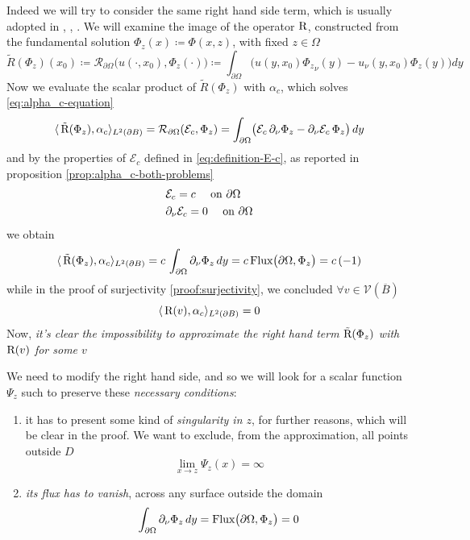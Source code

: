 \documentclass[10pt, a4paper, twoside, openright]{book}
\theoremstyle{definition}
\theoremstyle{plain}
\theoremstyle{plain}
\theoremstyle{plain}
\theoremstyle{plain}
\theoremstyle{plain}
\theoremstyle{plain}
\theoremstyle{plain}
\theoremstyle{plain}
\begin{document}
\par
Indeed we will try to consider the same right hand side term, which is usually adopted in \cite{colton-haddar:rg}, \cite{dicristo-sun:2006}, \cite{dicristo-sun:2007}.
We will examine the image of the operator $\textup{R}$, constructed from the fundamental solution $\Phi_z(x)\coloneqq\Phi(x,z)$, with fixed $z\in\Omega$
\begin{equation}
 \tilde{R}(\Phi_z)(x_0) \coloneqq \mathcal{R}_{\partial\Omega}\bigl(u(\cdot,x_0),\Phi_z(\cdot)\bigr)\coloneqq \int_{\partial \Omega}\bigl(u(y,x_0){\Phi_z}_\nu (y) - u_\nu(y,x_0)\Phi_z(y)\bigr)dy
\end{equation}
Now we evaluate the scalar product of $\tilde{R}(\Phi_z)$ with $\alpha_{c}$, which solves \eqref{eq:alpha_c-equation}
\begin{equation}
 \langle \, \tilde{\textup{R}}(\Phi_z) ,\alpha_{c}\rangle_{L^2(\partial B)}=\mathcal{R}_{\partial \Omega}(\mathcal{E}_{c}, \Phi_z)=\int_{\partial\Omega}\bigl(\mathcal{E}_{c}\,\partial_\nu \Phi_z - \partial_\nu\mathcal{E}_{c}\, \Phi_z\bigr)\,dy
\end{equation}
and by the properties of $\mathcal{E}_{c}$ defined in \eqref{eq:definition-E-c}, as reported in proposition \ref{prop:alpha_c-both-problems}
\begin{align}
 &\mathcal{E}_{c}=c \quad\textup{ on }\partial\Omega\\
 &\partial_\nu\mathcal{E}_{c}=0\quad \textup{ on }\partial\Omega
\end{align}
we obtain
\begin{equation}
 \langle \, \tilde{\textup{R}}(\Phi_z) ,\alpha_{c}\rangle_{L^2(\partial B)} = c\,\int_{\partial\Omega}\partial_\nu\Phi_z\,dy = c\,\textup{Flux}\bigl(\partial\Omega, \Phi_z\bigr) = c\,(-1)
\end{equation}
while in the proof of surjectivity \ref{proof:surjectivity}, we concluded $\forall v\in\mathcal{V}(\overline{B})$
\begin{equation}
 \langle \, \textup{R}(v) ,\alpha_{c}\rangle_{L^2(\partial B)}=0
\end{equation}
Now, \emph{it's clear the impossibility to approximate the right hand term $\tilde{\textup{R}}(\Phi_z)$ with $\textup{R}(v)$ for some $v$}
\par
We need to modify the right hand side, and so we will look for a scalar function $\Psi_z$ such to preserve these \emph{necessary conditions}:
\begin{enumerate}
 \item it has to present some kind of \emph{singularity in $z$}, for further reasons, which will be clear in the proof. We want to exclude, from the approximation, all points outside $D$
 \begin{equation}
  \lim_{x\to z}\Psi_z(x) = \infty
 \end{equation}
 \item \emph{its flux has to vanish}, across any surface outside the domain
 \begin{equation}
  \int_{\partial\Omega}\partial_\nu\Phi_z\,dy = \textup{Flux}\bigl(\partial\Omega, \Phi_z\bigr) = 0
 \end{equation}
\end{enumerate}
\end{document}
